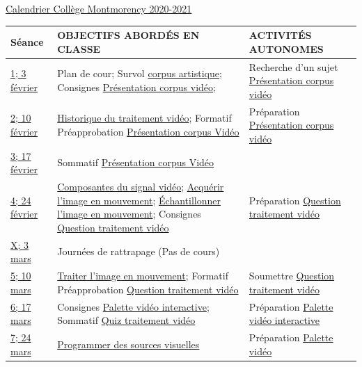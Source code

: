 \documentclass[
  french,
]{book}
\begin{document}
\href{https://www.cmontmorency.qc.ca/wp-content/uploads/images/college/administration/CALENDRIER-SCOLAIRE-2020-2021.pdf}{Calendrier Collège Montmorency 2020-2021}

\begin{longtable}[]{@{}
  >{\raggedright\arraybackslash}p{}
  >{\raggedright\arraybackslash}p{}
  >{\raggedright\arraybackslash}p{}@{}}
\toprule
Séance & OBJECTIFS ABORDÉS EN CLASSE & ACTIVITÉS AUTONOMES \\
\midrule
\endhead
\protect\hyperlink{semaine_1}{1;
3
février} & Plan de cour;
Survol \protect\hyperlink{corpus}{corpus artistique};
Consignes \protect\hyperlink{sommatif_1}{Présentation corpus
vidéo}; & Recherche d'un sujet \protect\hyperlink{sommatif_1}{Présentation corpus
vidéo} \\
\protect\hyperlink{semaine_2}{2;
10
février} & \protect\hyperlink{evolution_historique}{Historique du traitement
vidéo};
Formatif Préapprobation \protect\hyperlink{sommatif_1}{Présentation corpus
Vidéo} & Préparation \protect\hyperlink{sommatif_1}{Présentation corpus
vidéo} \\
\protect\hyperlink{semaine_3}{3;
17
février} & Sommatif \protect\hyperlink{sommatif_1}{Présentation corpus
Vidéo} & \\
\protect\hyperlink{semaine_4}{4;
24
février} & \protect\hyperlink{lexique}{Composantes du signal vidéo};
\protect\hyperlink{acquerir}{Acquérir l'image en mouvement};
\protect\hyperlink{echantillonner}{Échantillonner l'image en
mouvement};
Consignes \protect\hyperlink{sommatif_2}{Question traitement
vidéo} & Préparation \protect\hyperlink{sommatif_2}{Question traitement
vidéo} \\
\protect\hyperlink{semaine_5}{X;
3
mars} & Journées de rattrapage (Pas de cours) & \\
\protect\hyperlink{semaine_6}{5;
10
mars} & \protect\hyperlink{traiter}{Traiter l'image en mouvement};
Formatif Préapprobation \protect\hyperlink{sommatif_2}{Question traitement
vidéo} & Soumettre \protect\hyperlink{sommatif_2}{Question traitement
vidéo} \\
\protect\hyperlink{semaine_7}{6;
17
mars} & Consignes \protect\hyperlink{sommatif_4}{Palette vidéo
interactive};
Sommatif \protect\hyperlink{sommatif_3}{Quiz traitement vidéo} & Préparation \protect\hyperlink{sommatif_4}{Palette vidéo
interactive} \\
\protect\hyperlink{semaine_8}{7;
24
mars} & \protect\hyperlink{programmer}{Programmer des sources visuelles} & Préparation \protect\hyperlink{sommatif_4}{Palette vidéo
}
\end{longtable}
\end{document}
